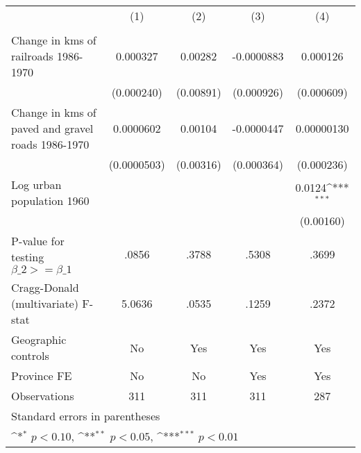 {
\def\sym#1{\ifmmode^{#1}\else\(^{#1}\)\fi}
\begin{tabular}{l*{4}{c}}
\hline\hline
                &\multicolumn{1}{c}{(1)}&\multicolumn{1}{c}{(2)}&\multicolumn{1}{c}{(3)}&\multicolumn{1}{c}{(4)}\\
                &\multicolumn{1}{c}{}&\multicolumn{1}{c}{}&\multicolumn{1}{c}{}&\multicolumn{1}{c}{}\\
\hline
Change in kms of railroads 1986-1970& 0.000327         &  0.00282         &-0.0000883         & 0.000126         \\
                &(0.000240)         &(0.00891)         &(0.000926)         &(0.000609)         \\
[1em]
Change in kms of paved and gravel roads 1986-1970&0.0000602         &  0.00104         &-0.0000447         &0.00000130         \\
                &(0.0000503)         &(0.00316)         &(0.000364)         &(0.000236)         \\
[1em]
Log urban population 1960&                  &                  &                  &   0.0124\sym{***}\\
                &                  &                  &                  &(0.00160)         \\
\hline
P-value for testing $\beta\_{2} >= \beta\_{1}$&    .0856         &    .3788         &    .5308         &    .3699         \\
Cragg-Donald (multivariate) F-stat&   5.0636         &    .0535         &    .1259         &    .2372         \\
Geographic controls&       No         &      Yes         &      Yes         &      Yes         \\
Province FE     &       No         &       No         &      Yes         &      Yes         \\
Observations    &      311         &      311         &      311         &      287         \\
\hline\hline
\multicolumn{5}{l}{\footnotesize Standard errors in parentheses}\\
\multicolumn{5}{l}{\footnotesize \sym{*} \(p<0.10\), \sym{**} \(p<0.05\), \sym{***} \(p<0.01\)}\\
\end{tabular}
}
